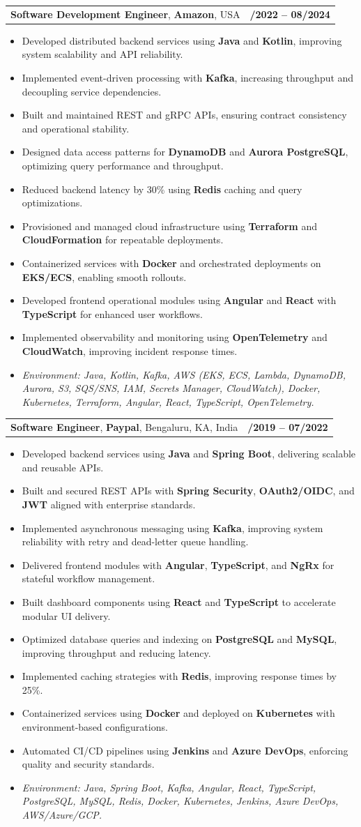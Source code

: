 \documentclass[letterpaper,11pt]{article}
\makeatletter
\newcommand{\resumeItem}[1]{
  \item\footnotesize{
    {#1 \vspace{-2pt}}
  }
}
\newcommand{\resumeSubheading}[4]{
  \vspace{-2pt}\item
    \begin{tabular*}{1.0\textwidth}[t]{l@{\extracolsep{\fill}}r}
      \textbf{\fontsize{10pt}{14pt}\selectfont #3}, \textbf{\fontsize{10pt}{14pt}\selectfont #1}, \fontsize{10pt}{14pt}\selectfont #4 & \textbf{\fontsize{10pt}{14pt}\selectfont #2} \\
    \end{tabular*}\vspace{-7pt}
}
\newcommand{\resumeItemListStart}{\begin{itemize}[leftmargin=*]}
\newcommand{\resumeItemListEnd}{\end{itemize}\vspace{-5pt}}
\makeatother
\begin{document}
\resumeSubheading
{Amazon}{10/2022 -- 08/2024}
{Software Development Engineer}{USA}
\resumeItemListStart
  \resumeItem{Developed distributed backend services using \textbf{Java} and \textbf{Kotlin}, improving system scalability and API reliability.}
  \resumeItem{Implemented event-driven processing with \textbf{Kafka}, increasing throughput and decoupling service dependencies.}
  \resumeItem{Built and maintained REST and gRPC APIs, ensuring contract consistency and operational stability.}
  \resumeItem{Designed data access patterns for \textbf{DynamoDB} and \textbf{Aurora PostgreSQL}, optimizing query performance and throughput.}
  \resumeItem{Reduced backend latency by 30\% using \textbf{Redis} caching and query optimizations.}
  \resumeItem{Provisioned and managed cloud infrastructure using \textbf{Terraform} and \textbf{CloudFormation} for repeatable deployments.}
  \resumeItem{Containerized services with \textbf{Docker} and orchestrated deployments on \textbf{EKS/ECS}, enabling smooth rollouts.}
  \resumeItem{Developed frontend operational modules using \textbf{Angular} and \textbf{React} with \textbf{TypeScript} for enhanced user workflows.}
  \resumeItem{Implemented observability and monitoring using \textbf{OpenTelemetry} and \textbf{CloudWatch}, improving incident response times.}
  \resumeItem{\textit{Environment: Java, Kotlin, Kafka, AWS (EKS, ECS, Lambda, DynamoDB, Aurora, S3, SQS/SNS, IAM, Secrets Manager, CloudWatch), Docker, Kubernetes, Terraform, Angular, React, TypeScript, OpenTelemetry.}}
\resumeItemListEnd

\resumeSubheading
{Paypal}{08/2019 -- 07/2022}
{Software Engineer}{Bengaluru, KA, India}
\resumeItemListStart
  \resumeItem{Developed backend services using \textbf{Java} and \textbf{Spring Boot}, delivering scalable and reusable APIs.}
  \resumeItem{Built and secured REST APIs with \textbf{Spring Security}, \textbf{OAuth2/OIDC}, and \textbf{JWT} aligned with enterprise standards.}
  \resumeItem{Implemented asynchronous messaging using \textbf{Kafka}, improving system reliability with retry and dead-letter queue handling.}
  \resumeItem{Delivered frontend modules with \textbf{Angular}, \textbf{TypeScript}, and \textbf{NgRx} for stateful workflow management.}
  \resumeItem{Built dashboard components using \textbf{React} and \textbf{TypeScript} to accelerate modular UI delivery.}
  \resumeItem{Optimized database queries and indexing on \textbf{PostgreSQL} and \textbf{MySQL}, improving throughput and reducing latency.}
  \resumeItem{Implemented caching strategies with \textbf{Redis}, improving response times by 25\%.}
  \resumeItem{Containerized services using \textbf{Docker} and deployed on \textbf{Kubernetes} with environment-based configurations.}
  \resumeItem{Automated CI/CD pipelines using \textbf{Jenkins} and \textbf{Azure DevOps}, enforcing quality and security standards.}
  \resumeItem{\textit{Environment: Java, Spring Boot, Kafka, Angular, React, TypeScript, PostgreSQL, MySQL, Redis, Docker, Kubernetes, Jenkins, Azure DevOps, AWS/Azure/GCP.}}
\resumeItemListEnd
\end{document}
